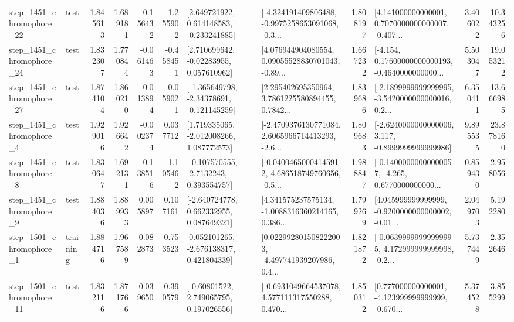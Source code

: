 \begin{tabular}{llrrrrllrlrr}
 step\_1451\_chromophore\_22 &      test &      1.845613 &    1.689181 &     -0.156432 & -1.255902 &    [2.649721922, 0.614148583, -0.233241885] &  [-4.324191409806488, -0.9975258653091068, -0.3... &       1.808197 &  [4.141000000000001, 0.7070000000000007, -0.407... &            3.406022 &         10.343256 \\
 step\_1451\_chromophore\_24 &      test &      1.832307 &    1.770844 &     -0.061463 & -0.458451 &     [2.710699642, -0.02283955, 0.057610962] &  [4.076944904080554, 0.09055528830701043, -0.89... &       1.667232 &  [-4.154, 0.17600000000000193, -0.4640000000000... &            5.503047 &         19.053212 \\
 step\_1451\_chromophore\_27 &      test &      1.874104 &    1.860210 &     -0.013894 & -0.059021 &   [-1.365649798, -2.34378691, -0.121145259] &  [2.295402695350964, 3.7861225580894455, 0.7842... &       1.839686 &  [-2.1899999999999995, -3.5420000000000016, 0.2... &            6.350411 &         13.666985 \\
  step\_1451\_chromophore\_4 &      test &      1.929016 &    1.926642 &     -0.002374 &  0.037712 &    [1.719335065, -2.012008266, 1.087772573] &  [-2.4709376130771084, 2.6065966714413293, -2.6... &       1.809683 &  [-2.6240000000000006, 3.117, -0.8999999999999986] &            9.895535 &         23.878160 \\
  step\_1451\_chromophore\_8 &      test &      1.830647 &    1.692131 &     -0.138516 & -1.105462 &     [-0.107570555, -2.7132243, 0.393554757] &  [-0.04004650004145912, 4.686518749760656, -0.5... &       1.988847 &  [-0.14000000000000057, -4.265, 0.6770000000000... &            0.859430 &          2.958056 \\
  step\_1451\_chromophore\_9 &      test &      1.884036 &    1.889933 &      0.005897 &  0.107161 &    [-2.640724778, 0.662332955, 0.087649321] &  [4.341575237575134, -1.0088316360214165, 0.386... &       1.799269 &  [4.045999999999999, -0.9200000000000002, -0.01... &            2.049703 &          5.192280 \\
  step\_1501\_chromophore\_1 &  training &      1.884716 &    1.967589 &      0.082873 &  0.753523 &    [0.052101265, -2.676138317, 0.421804339] &  [0.022992801508222003, -4.497741939207986, 0.4... &       1.821872 &  [-0.06399999999999995, 4.172999999999998, -0.2... &            5.737449 &          2.352646 \\
 step\_1501\_chromophore\_11 &      test &      1.832116 &    1.871766 &      0.039650 &  0.390579 &     [-0.60801522, 2.749065795, 0.197026556] &  [-0.6931049664537078, 4.577111317550288, 0.470... &       1.850312 &  [0.777000000000001, -4.123999999999999, -0.670... &            5.374528 &          3.855299 \\

\end{tabular}
